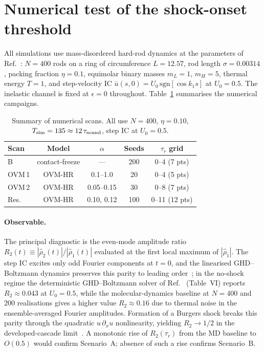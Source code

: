\documentclass[aps,pre,twocolumn,superscriptaddress,longbibliography,floatfix]{revtex4-2}
\begin{document}
\section{Numerical test of the shock-onset threshold}
\label{sec:numerical}

All simulations use mass-disordered hard-rod dynamics at the
parameters of Ref.~\cite{PaperIII}: $N=400$ rods on a ring
of circumference $L=12.57$, rod length
$\sigma=0.00314$, packing fraction $\eta=0.1$, equimolar
binary masses $m_L=1$, $m_H=5$, thermal energy $T=1$, and
step-velocity IC
$\bar u(s,0)=U_0\,\mathrm{sgn}[\cos k_1 s]$ at $U_0=0.5$.
The inelastic channel is fixed at $\epsilon=0$ throughout.
Table~\ref{tab:scans} summarises the numerical campaigns.

\begin{table}[htbp]
\caption{Summary of numerical scans. All use $N=400$,
  $\eta=0.10$, $T_{\rm sim}=135\approx 12\,\tau_{\rm sound}$,
  step IC at $U_0=0.5$.}
\label{tab:scans}
\centering
\begin{tabular}{lcccc}
\hline\hline
Scan & Model & $\alpha$ & Seeds & $\tau_r$ grid \\
\hline
B    & contact-freeze & --- & 200 & 0--4 (7 pts) \\
OVM\,1 & OVM-HR & 0.1--1.0 & 20  & 0--4 (5 pts) \\
OVM\,2 & OVM-HR & 0.05--0.15 & 30  & 0--8 (7 pts) \\
Res. & OVM-HR & 0.10, 0.12 & 100 & 0--11 (12 pts) \\
\hline\hline
\end{tabular}
\end{table}

\paragraph*{Observable.}
The principal diagnostic is the even-mode amplitude ratio
$R_2(t)\equiv|\hat\rho_2(t)|/|\hat\rho_1(t)|$ evaluated at
the first local maximum of $|\hat\rho_1|$. The step IC
excites only odd Fourier components at $t=0$, and the
linearised GHD--Boltzmann dynamics preserves this parity to
leading order~\cite{PaperIV,PaperV}; in the no-shock regime
the deterministic GHD--Boltzmann solver of
Ref.~\cite{PaperV} (Table~VI) reports $R_2\approx 0.043$ at
$U_0=0.5$, while the molecular-dynamics baseline at $N=400$
and 200 realisations gives a higher value $R_2\approx 0.16$
due to thermal noise in the ensemble-averaged Fourier
amplitudes. Formation of a Burgers shock breaks this parity
through the quadratic $u\,\partial_x u$ nonlinearity,
yielding $R_2\to 1/2$ in the developed-cascade
limit~\cite{PaperIV}. A monotonic rise of $R_2(\tau_r)$ from
the MD baseline to $O(0.5)$ would confirm Scenario~A;
absence of such a rise confirms Scenario~B.
\end{document}
